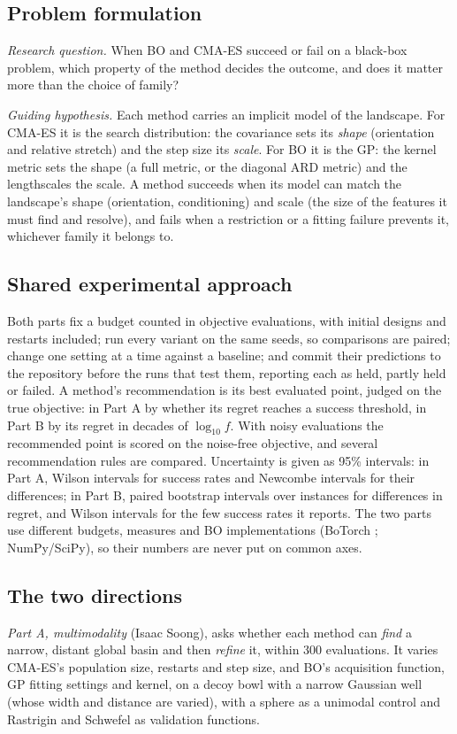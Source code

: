 \documentclass[10pt,a4paper]{article}
\begin{document}
\subsection{Problem formulation}
\emph{Research question.} When BO and CMA-ES succeed or fail on a black-box problem, which property of the
method decides the outcome, and does it matter more than the choice of family?

\emph{Guiding hypothesis.} Each method carries an implicit model of the landscape. For CMA-ES it is the search
distribution: the covariance sets its \emph{shape} (orientation and relative stretch) and the step size its
\emph{scale}. For BO it is the GP: the kernel metric sets the shape (a full metric, or the diagonal ARD metric)
and the lengthscales the scale. A method succeeds when its model can match the landscape's shape (orientation,
conditioning) and scale (the size of the features it must find and resolve), and fails when a restriction or a
fitting failure prevents it, whichever family it belongs to.

\subsection{Shared experimental approach}
Both parts fix a budget counted in objective evaluations, with initial designs and restarts included; run
every variant on the same seeds, so comparisons are paired; change one setting at a time against a baseline;
and commit their predictions to the repository before the runs that test them, reporting each as held, partly
held or failed. A method's recommendation is its best evaluated point, judged on the true objective: in Part A
by whether its regret reaches a success threshold, in Part B by its regret in decades of $\log_{10} f$. With
noisy evaluations the recommended point is scored on the noise-free objective, and several recommendation
rules are compared. Uncertainty is given as 95\% intervals: in Part A, Wilson intervals for success rates and
Newcombe intervals for their differences; in Part B, paired bootstrap intervals over instances for differences in
regret, and Wilson intervals for the few success rates it reports. The two parts use different budgets, measures and BO
implementations (BoTorch \citep{balandat2020botorch}; NumPy/SciPy), so their numbers are never put on common
axes.

\subsection{The two directions}
\emph{Part A, multimodality} (Isaac Soong), asks whether each method can \emph{find} a narrow, distant global
basin and then \emph{refine} it, within 300 evaluations. It varies CMA-ES's population size, restarts and step
size, and BO's acquisition function, GP fitting settings and kernel, on a decoy bowl with a narrow Gaussian well
(whose width and distance are varied), with a sphere as a unimodal control and Rastrigin and Schwefel as
validation functions.
\end{document}
